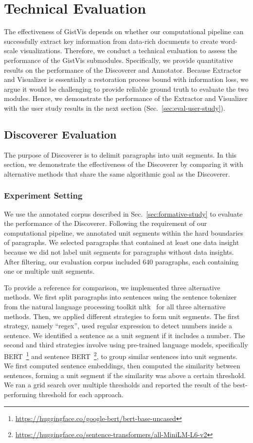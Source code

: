 \section{Technical Evaluation}
\label{sec:technical-eval}
The effectiveness of GistVis depends on whether our computational pipeline can successfully extract key information from data-rich documents to create word-scale visualizations. Therefore, we conduct a technical evaluation to assess the performance of the GistVis submodules. Specifically, we provide quantitative results on the performance of the Discoverer and Annotator. Because Extractor and Visualizer is essentially a restoration process bound with information loss, we argue it would be challenging to provide reliable ground truth to evaluate the two modules. Hence, we demonstrate the performance of the Extractor and Visualizer with the user study results in the next section (Sec.~\ref{sec:eval-user-study}).

\subsection{Discoverer Evaluation}
The purpose of Discoverer is to delimit paragraphs into unit segments. In this section, we demonstrate the effectiveness of the Discoverer by comparing it with alternative methods that share the same algorithmic goal as the Discoverer.

\subsubsection{Experiment Setting}
We use the annotated corpus described in Sec.~\ref{sec:formative-study} to evaluate the performance of the Discoverer. Following the requirement of our computational pipeline, we annotated unit segments within the hard boundaries of paragraphs. We selected paragraphs that contained at least one data insight because we did not label unit segments for paragraphs without data insights. After filtering, our evaluation corpus included 640 paragraphs, each containing one or multiple unit segments. 

To provide a reference for comparison, we implemented three alternative methods. We first split paragraphs into sentences using the sentence tokenizer from the natural language processing toolkit nltk~\cite{bird2009natural} for all three alternative methods. Then, we applied different strategies to form unit segments. The first strategy, namely ``regex'', used regular expression to detect numbers inside a sentence. We identified a sentence as a unit segment if it includes a number. The second and third strategies involve using pre-trained language models, specifically BERT~\cite{devlin-etal-2019-bert}\footnote{\url{https://huggingface.co/google-bert/bert-base-uncased}} and sentence BERT~\cite{reimers-gurevych-2019-sentence}\footnote{\url{https://huggingface.co/sentence-transformers/all-MiniLM-L6-v2}}, to group similar sentences into unit segments. We first computed sentence embeddings, then computed the similarity between sentences, forming a unit segment if the similarity was above a certain threshold. We ran a grid search over multiple thresholds and reported the result of the best-performing threshold for each approach.

